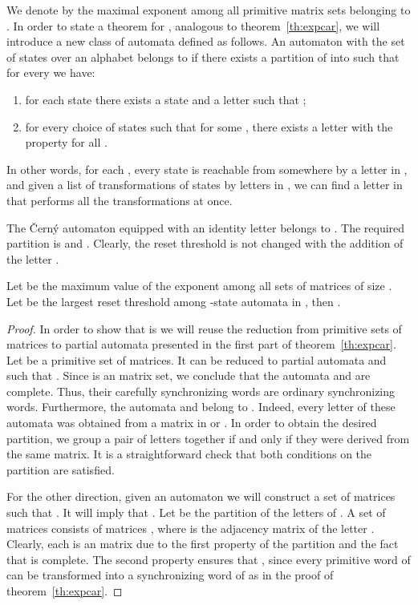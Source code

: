 \documentclass[a4paper,USenglish]{lipics}
\theoremstyle{definition}
\begin{document}
We denote by  the maximal exponent among all primitive matrix sets belonging to .
In order to state a theorem for , analogous to theorem~\ref{th:expcar}, we will introduce a new class of automata  defined as follows. An automaton  with the set of states  over an alphabet  belongs to  if there exists a partition of  into  such that for every  we have:
\begin{enumerate}
\item for each state  there exists a state  and a letter  such that ;
\item for every choice of states  such that  for some , there exists a letter  with the property  for all .
\end{enumerate}
In other words, for each , every state is reachable from somewhere by a letter in , and given a list of transformations of states by letters in , we can find a letter in  that performs all the transformations at once. 
\begin{example}
The \v{C}ern\'{y} automaton  equipped with an identity letter  belongs to . The required partition is  and . Clearly, the reset threshold is not changed with the addition of the letter .
\end{example}
\begin{theorem}
\label{th:nzrcclass}
Let   be the maximum value of the exponent among all sets of  matrices of size . Let  be the largest reset threshold among -state automata in , then .
\end{theorem}
\begin{proof}
In order to show that  is  we will reuse the reduction from primitive sets of matrices to partial automata presented in the first part of theorem~\ref{th:expcar}. Let  be a primitive set of  matrices. It can be reduced to partial automata  and  such that . Since  is an  matrix set, we conclude that the automata  and  are complete. Thus, their carefully synchronizing words are ordinary synchronizing words. Furthermore, the automata  and  belong to . Indeed, every letter of these automata was obtained from a matrix in  or . In order to obtain the desired partition, we group a pair of letters together if and only if they were derived from the same matrix. It is a straightforward check that both conditions on the partition are satisfied.

For the other direction, given an automaton  we will construct a set of  matrices  such that . It will imply that . Let  be the partition of the letters of . A set of matrices  consists of matrices , where  is the adjacency matrix of the letter . Clearly, each  is an  matrix due to the first property of the partition and the fact that  is complete. The second property ensures that , since every primitive word of  can be transformed into a synchronizing word of  as in the proof of theorem~\ref{th:expcar}.
\end{proof}
\end{document}
